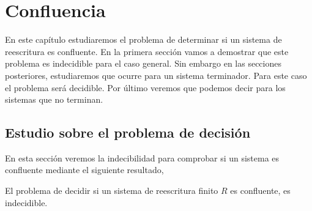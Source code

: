 \chapter{Confluencia}

En este capítulo estudiaremos el problema de determinar si un sistema
de reescritura es confluente. En la primera sección vamos a demostrar
que este problema es indecidible para el caso general. Sin embargo en
las secciones posteriores, estudiaremos que ocurre para un sistema
terminador. Para este caso el problema será decidible. Por último
veremos que podemos decir para los sistemas que no terminan.

\section{Estudio sobre el problema de decisión}
  
En esta sección veremos la indecibilidad para comprobar si un sistema
es confluente mediante el siguiente resultado,

\begin{teor}
  El problema de decidir si un sistema de reescritura finito $R$ es
  confluente, es indecidible.
\end{teor}

